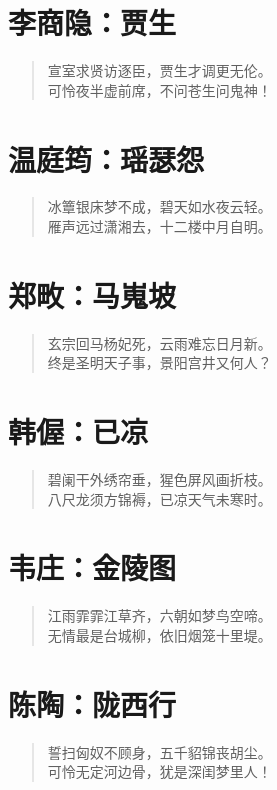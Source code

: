 \documentclass[12pt,oneside]{book}
\newenvironment{shici}{
\begin{verse}
\centering\large\hspace{12pt}}
{\end{verse}}
\begin{document}
\chapter{李商隐：贾生}
\begin{shici}
宣室求贤访逐臣，贾生才调更无伦。\\
可怜夜半虚前席，不问苍生问鬼神！
\end{shici}

\chapter{温庭筠：瑶瑟怨}
\begin{shici}
冰簟银床梦不成，碧天如水夜云轻。\\
雁声远过潇湘去，十二楼中月自明。
\end{shici}

\chapter{郑畋：马嵬坡}
\begin{shici}
玄宗回马杨妃死，云雨难忘日月新。\\
终是圣明天子事，景阳宫井又何人？
\end{shici}

\chapter{韩偓：已凉}
\begin{shici}
碧阑干外绣帘垂，猩色屏风画折枝。\\
八尺龙须方锦褥，已凉天气未寒时。
\end{shici}

\chapter{韦庄：金陵图}
\begin{shici}
江雨霏霏江草齐，六朝如梦鸟空啼。\\
无情最是台城柳，依旧烟笼十里堤。
\end{shici}

\chapter{陈陶：陇西行}
\begin{shici}
誓扫匈奴不顾身，五千貂锦丧胡尘。\\
可怜无定河边骨，犹是深闺梦里人！
\end{shici}
\end{document}
